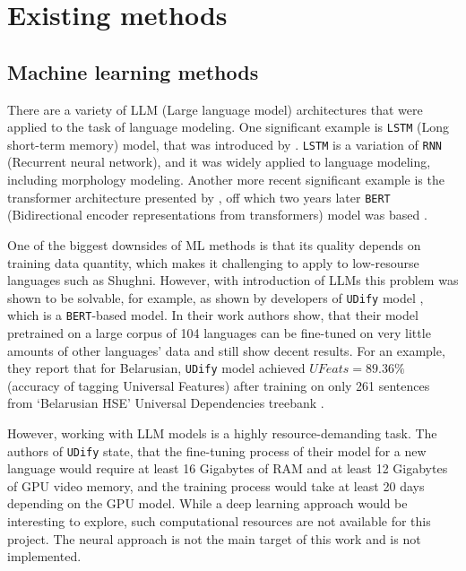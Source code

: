 \section{Existing methods}

\subsection{Machine learning methods} \label{dl_methods}
There are a variety of LLM (Large language model) architectures that were applied to the task of language modeling. One significant example is \texttt{LSTM} (Long short-term memory) model, that was introduced by \textcite{lstm_1997}. \texttt{LSTM} is a variation of \texttt{RNN} (Recurrent neural network), and it was widely applied to language modeling, including morphology modeling. Another more recent significant example is the transformer architecture presented by \textcite{transformer_2017}, off which two years later \texttt{BERT} (Bidirectional encoder representations from transformers) model was based \parencite{devlin_2019}. 

One of the biggest downsides of ML methods is that its quality depends on training data quantity, which makes it challenging to apply to low-resourse languages such as Shughni. However, with introduction of LLMs this problem was shown to be solvable, for example, as shown by developers of \texttt{UDify} model \parencite{kondratyuk_straka_model_2019}, which is a \texttt{BERT}-based model. In their work authors show, that their model pretrained on a large corpus of 104 languages can be fine-tuned on very little amounts of other languages' data and still show decent results. For an example, they report that for Belarusian, \texttt{UDify} model achieved $UFeats=89.36\%$ (accuracy of tagging Universal Features) after training on only 261 sentences from `Belarusian HSE' Universal Dependencies treebank \parencite[Table 7]{kondratyuk_straka_model_2019}.

However, working with LLM models is a highly resource-demanding task. The authors of \texttt{UDify} state, that the fine-tuning process of their model for a new language would require at least 16 Gigabytes of RAM and at least 12 Gigabytes of GPU video memory, and the training process would take at least 20 days depending on the GPU model. While a deep learning approach would be interesting to explore, such computational resources are not available for this project. The neural approach is not the main target of this work and is not implemented. 

